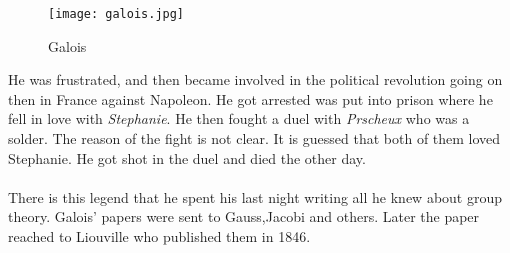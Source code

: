 \begin{wrapfigure}{r}{0.27\textwidth}
  \texttt{[image: galois.jpg]}
  \caption{Galois}
\end{wrapfigure}

He was frustrated, and then became involved in the political revolution going on then in France against Napoleon. He got arrested was put into prison where he fell in love with \textit{Stephanie}. He then fought a duel with \textit{Prscheux} who was a solder. The reason of the fight is not clear. It is guessed that both of them loved Stephanie. He got shot in the duel and died the other day.\\ \\
There is this legend that he spent his last night writing all he knew about group theory. Galois’ papers were sent to Gauss,Jacobi and others. Later the paper reached to Liouville who published them in 1846.